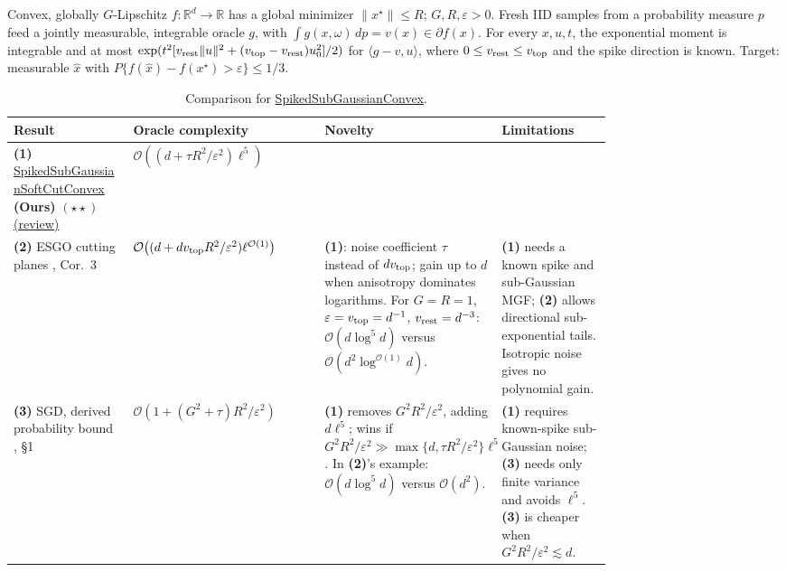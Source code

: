 \begin{table}[tp]
\centering
\caption{Comparison for \href{https://github.com/k3nfalt/longtails/blob/main/LongTails/Setups/SpikedSubGaussianConvex.lean}{SpikedSubGaussianConvex}.}\label{tab:SpikedSubGaussianConvex}
\parbox{\linewidth}{\footnotesize Convex, globally $G$-Lipschitz $f:\mathbb R^d\to\mathbb R$ has a global minimizer $\|x^\star\|\le R$; $G,R,\varepsilon>0$. Fresh IID samples from a probability measure $p$ feed a jointly measurable, integrable oracle $g$, with $\int g(x,\omega)\,dp=v(x)\in\partial f(x)$. For every $x,u,t$, the exponential moment is integrable and at most $\exp(t^2[v_{\rm rest}\|u\|^2+(v_{\rm top}-v_{\rm rest})u_0^2]/2)$ for $\langle g-v,u\rangle$, where $0\le v_{\rm rest}\le v_{\rm top}$ and the spike direction is known. Target: measurable $\hat x$ with $P\{f(\hat x)-f(x^\star)>\varepsilon\}\le1/3$.}\par\smallskip
\begin{threeparttable}
\footnotesize
\setlength{\tabcolsep}{4pt}\renewcommand{\arraystretch}{1.25}
\begin{tabularx}{\linewidth}{@{}>{\raggedright\arraybackslash}p{0.20\linewidth}>{\raggedright\arraybackslash}p{0.32\linewidth}>{\raggedright\arraybackslash}p{0.25\linewidth}>{\raggedright\arraybackslash}X@{}}
\toprule
\textbf{Result} & \textbf{Oracle complexity} & \textbf{Novelty} & \textbf{Limitations} \\
\midrule
\textbf{(1)} \href{https://github.com/k3nfalt/longtails/blob/main/LongTails/Theorems/SpikedSubGaussianSoftCutConvex.lean}{Spiked\allowbreak Sub\allowbreak Gaussian\allowbreak Soft\allowbreak Cut\allowbreak Convex} \textbf{(Ours)} $(\star\star)$ \href{https://github.com/k3nfalt/longtails/blob/main/scripts/reviews/SpikedSubGaussianSoftCutConvex.md}{(review)} & $\mathcal{O}\!\left((d+\tau R^2/\varepsilon^2)\ell^5\right)$ & & \\
\midrule[1.2pt]
\textbf{(2)} ESGO cutting planes \citep{spikedMOSZ2025v1}, Cor.~3 & $\mathcal{O}\!\left((d+d v_{\rm top}R^2/\varepsilon^2)\ell^{\mathcal{O}(1)}\right)$ & \textbf{(1)}: noise coefficient $\tau$ instead of $dv_{\rm top}$; gain up to $d$ when anisotropy dominates logarithms. For $G=R=1$, $\varepsilon=v_{\rm top}=d^{-1}$, $v_{\rm rest}=d^{-3}$: $\mathcal{O}(d\log^5d)$ versus $\mathcal{O}(d^2\log^{\mathcal{O}(1)}d)$. & \textbf{(1)} needs a known spike and sub-Gaussian MGF; \textbf{(2)} allows directional sub-exponential tails. Isotropic noise gives no polynomial gain. \\
\midrule
\textbf{(3)} SGD, derived probability bound \citep{spikedMOSZ2025v1}, \S1 & $\mathcal{O}\!\left(1+(G^2+\tau)R^2/\varepsilon^2\right)$ & \textbf{(1)} removes $G^2R^2/\varepsilon^2$, adding $d\ell^5$; wins if $G^2R^2/\varepsilon^2\gg\max\{d,\tau R^2/\varepsilon^2\}\ell^5$. In \textbf{(2)}'s example: $\mathcal{O}(d\log^5d)$ versus $\mathcal{O}(d^2)$. & \textbf{(1)} requires known-spike sub-Gaussian noise; \textbf{(3)} needs only finite variance and avoids $\ell^5$. \textbf{(3)} is cheaper when $G^2R^2/\varepsilon^2\lesssim d$. \\

\end{tabularx}
\end{threeparttable}
\end{table}
